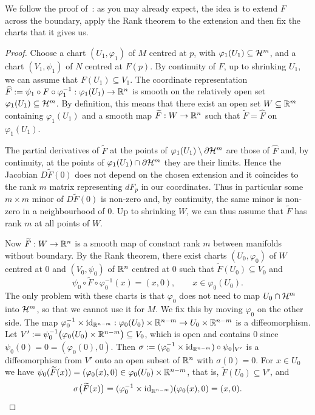 We follow the proof of~\cite[Theorem 4.15]{book:lee}: as you may already expect, the idea is to extend $F$ across the boundary, apply the Rank theorem to the extension and then fix the charts that it gives us.

\begin{proof}
	Choose a chart $(U_1,\varphi_1)$ of $M$ centred at $p$, with $\varphi_1(U_1)\subseteq\mathcal{H}^m$, and a chart $(V_1,\psi_1)$ of $N$ centred at $F(p)$. By continuity of $F$, up to shrinking $U_1$, we can assume that $F(U_1)\subseteq V_1$.
	The coordinate representation $\widehat F := \psi_1\circ F\circ\varphi_1^{-1}:\varphi_1(U_1)\to\mathbb{R}^n$ is smooth on the relatively open set $\varphi_1(U_1)\subseteq\mathcal{H}^m$.
	By definition, this means that there exist an open set $W\subseteq\mathbb{R}^m$ containing $\varphi_1(U_1)$ and a smooth map $\widetilde F:W\to\mathbb{R}^n$ such that $\widetilde F = \widehat F$ on $\varphi_1(U_1)$.

	The partial derivatives of $\widetilde F$ at the points of $\varphi_1(U_1)\setminus\partial\mathcal{H}^m$ are those of $\widehat F$ and, by continuity, at the points of $\varphi_1(U_1)\cap\partial\mathcal{H}^m$ they are their limits.
	Hence the Jacobian $D\widetilde F(0)$ does not depend on the chosen extension and it coincides to the rank $m$ matrix representing $dF_p$ in our coordinates.
	Thus in particular some $m\times m$ minor of $D\widetilde F(0)$ is non-zero and, by continuity, the same minor is non-zero in a neighbourhood of $0$.
	Up to shrinking $W$, we can thus assume that $\widetilde F$ has rank $m$ at all points of $W$.

	Now $\widetilde F:W\to\mathbb{R}^n$ is a smooth map of constant rank $m$ between manifolds without boundary.
	By the Rank theorem, there exist charts $(U_0,\varphi_0)$ of $W$ centred at $0$ and $(V_0,\psi_0)$ of $\mathbb{R}^n$ centred at $0$ such that $\widetilde F(U_0)\subseteq V_0$ and
	\begin{equation}
		\psi_0\circ\widetilde F\circ\varphi_0^{-1}(x) = (x, 0), \qquad x\in\varphi_0(U_0).
	\end{equation}
	The only problem with these charts is that $\varphi_0$ does not need to map $U_0\cap\mathcal{H}^m$ into $\mathcal{H}^m$, so that we cannot use it for $M$.
	We fix this by moving $\varphi_0$ on the other side.
	The map $\varphi_0^{-1}\times\operatorname{id}_{\mathbb{R}^{n-m}}:\varphi_0(U_0)\times\mathbb{R}^{n-m}\to U_0\times\mathbb{R}^{n-m}$ is a diffeomorphism.
	Let $V' := \psi_0^{-1}\big(\varphi_0(U_0)\times\mathbb{R}^{n-m}\big)\subseteq V_0$, which is open and contains $0$ since $\psi_0(0) = 0 = (\varphi_0(0), 0)$.
	Then $\sigma := (\varphi_0^{-1}\times\operatorname{id}_{\mathbb{R}^{n-m}})\circ\psi_0|_{V'}$ is a diffeomorphism from $V'$ onto an open subset of $\mathbb{R}^n$ with $\sigma(0) = 0$.
	For $x\in U_0$ we have $\psi_0(\widetilde F(x)) = (\varphi_0(x), 0)\in\varphi_0(U_0)\times\mathbb{R}^{n-m}$, that is, $\widetilde F(U_0)\subseteq V'$, and
	\begin{equation}
		\sigma\big(\widetilde F(x)\big) = (\varphi_0^{-1}\times\operatorname{id}_{\mathbb{R}^{n-m}})(\varphi_0(x), 0) = (x, 0).
	\end{equation}


\end{proof}
